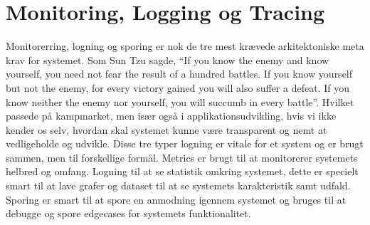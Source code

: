 \section{Monitoring, Logging og Tracing}

Monitorerring, logning og sporing er nok de tre mest krævede arkitektoniske meta krav for systemet. Som Sun Tzu sagde, ``If you know the enemy and know yourself, you need not fear the result of a hundred battles. If you know yourself but not the enemy, for every victory gained you will also suffer a defeat. If you know neither the enemy nor yourself, you will succumb in every battle''. Hvilket passede på kampmarket, men især også i applikationsudvikling, hvis vi ikke kender os selv, hvordan skal systemet kunne være transparent og nemt at vedligeholde og udvikle. Disse tre typer logning er vitale for et system og er brugt sammen, men til forskellige formål. Metrics er brugt til at monitorerer systemets helbred og omfang. Logning til at se statistik omkring systemet, dette er specielt smart til at lave grafer og dataset til at se systemets karakteristik samt udfald. Sporing er smart til at spore en anmodning igennem systemet og bruges til at debugge og spore edgecases for systemets funktionalitet.